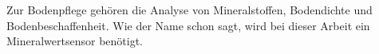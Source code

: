 Zur Bodenpflege gehören die Analyse von Mineralstoffen, Bodendichte und
Bodenbeschaffenheit. Wie der Name schon sagt, wird bei dieser Arbeit ein
Mineralwertsensor benötigt.\\